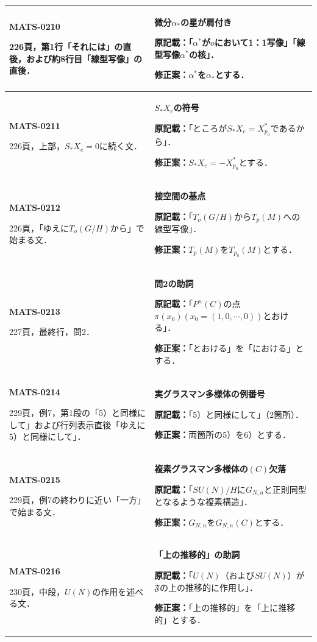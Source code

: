 \documentclass[a4paper,10pt]{ltjsarticle}
\begin{document}
\begin{longtable}{@{}>{\raggedright\arraybackslash}p{.19\linewidth}>{\raggedright\arraybackslash}p{.77\linewidth}@{}}
\hline
\hypertarget{MATS-0210}{}\textbf{MATS-0210}\par 226頁，第1行「それには」の直後，および約8行目「線型写像」の直後． & \textbf{微分$\alpha_*$の星が肩付き}\par\textbf{原記載：}「$\alpha^*$が$o$において1：1写像」「線型写像$\alpha^*$の核」．\par\textbf{修正案：}$\alpha^*$を$\alpha_*$とする． \\[3pt]
\hline
\hypertarget{MATS-0211}{}\textbf{MATS-0211}\par 226頁，上部，$S_*X_e=0$に続く文． & \textbf{$S_*X_e$の符号}\par\textbf{原記載：}「ところが$S_*X_e=X^*_{p_0}$であるから」．\par\textbf{修正案：}$S_*X_e=-X^*_{p_0}$とする． \\[3pt]
\hline
\hypertarget{MATS-0212}{}\textbf{MATS-0212}\par 226頁，「ゆえに$T_o(G/H)$から」で始まる文． & \textbf{接空間の基点}\par\textbf{原記載：}「$T_o(G/H)$から$T_p(M)$への線型写像」．\par\textbf{修正案：}$T_p(M)$を$T_{p_0}(M)$とする． \\[3pt]
\hline
\hypertarget{MATS-0213}{}\textbf{MATS-0213}\par 227頁，最終行，問2． & \textbf{問2の助詞}\par\textbf{原記載：}「$P^n(C)$の点$\pi(x_0)(x_0=(1,0,\cdots,0))$とおける」．\par\textbf{修正案：}「とおける」を「における」とする． \\[3pt]
\hline
\hypertarget{MATS-0214}{}\textbf{MATS-0214}\par 229頁，例7，第1段の「5）と同様にして」および行列表示直後「ゆえに5）と同様にして」． & \textbf{実グラスマン多様体の例番号}\par\textbf{原記載：}「5）と同様にして」（2箇所）．\par\textbf{修正案：}両箇所の5）を6）とする． \\[3pt]
\hline
\hypertarget{MATS-0215}{}\textbf{MATS-0215}\par 229頁，例7の終わりに近い「一方」で始まる文． & \textbf{複素グラスマン多様体の$(C)$欠落}\par\textbf{原記載：}「$SU(N)/H$に$G_{N,n}$と正則同型となるような複素構造」．\par\textbf{修正案：}$G_{N,n}$を$G_{N,n}(C)$とする． \\[3pt]
\hline
\hypertarget{MATS-0216}{}\textbf{MATS-0216}\par 230頁，中段，$U(N)$の作用を述べる文． & \textbf{「上の推移的」の助詞}\par\textbf{原記載：}「$U(N)$（および$SU(N)$）が$\mathfrak F$の上の推移的に作用し」．\par\textbf{修正案：}「上の推移的」を「上に推移的」とする． \\[3pt]

\end{longtable}
\end{document}
